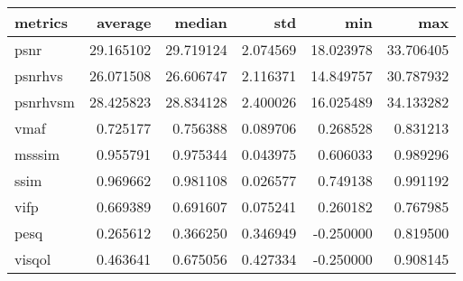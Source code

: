 \begin{tabular}{lrrrrr}
\toprule
metrics & average & median & std & min & max \\
\midrule
psnr & 29.165102 & 29.719124 & 2.074569 & 18.023978 & 33.706405 \\
psnrhvs & 26.071508 & 26.606747 & 2.116371 & 14.849757 & 30.787932 \\
psnrhvsm & 28.425823 & 28.834128 & 2.400026 & 16.025489 & 34.133282 \\
vmaf & 0.725177 & 0.756388 & 0.089706 & 0.268528 & 0.831213 \\
msssim & 0.955791 & 0.975344 & 0.043975 & 0.606033 & 0.989296 \\
ssim & 0.969662 & 0.981108 & 0.026577 & 0.749138 & 0.991192 \\
vifp & 0.669389 & 0.691607 & 0.075241 & 0.260182 & 0.767985 \\
pesq & 0.265612 & 0.366250 & 0.346949 & -0.250000 & 0.819500 \\
visqol & 0.463641 & 0.675056 & 0.427334 & -0.250000 & 0.908145 \\
\bottomrule
\end{tabular}
